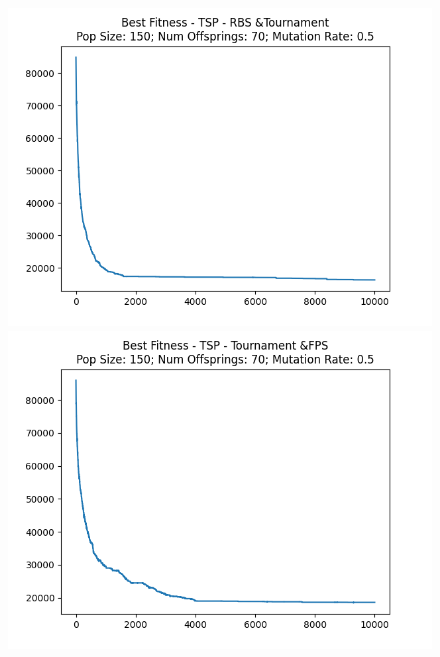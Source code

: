 \documentclass[12pt]{report}
\theoremstyle{mytheoremstyle}
\theoremstyle{mytheoremstyle}
\theoremstyle{myproblemstyle}
\begin{document}
\begin{figure}[!]
\begin{minipage}{0.4\textwidth}
		\includegraphics[width=\linewidth]{../Analysis/BSF_TSP_1_2_150_70.png}
	\end{minipage}
	\hspace{\fill}
	\begin{minipage}{0.4\textwidth}
		\includegraphics[width=\linewidth]{../Analysis/BSF_TSP_2_0_150_70.png}
	\end{minipage}
	\vspace*{1cm}
	\begin{minipage}{0.4\textwidth}

\end{minipage}
\end{figure}
\end{document}
